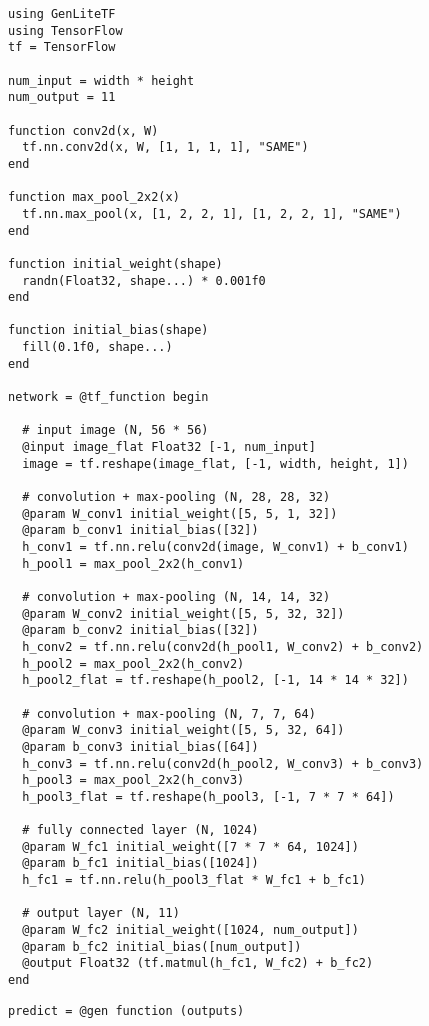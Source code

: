 \begin{figure}[t]
\begin{minipage}[t]{0.5\textwidth}
\begin{lstlisting}
using GenLiteTF
using TensorFlow
tf = TensorFlow

num_input = width * height
num_output = 11

function conv2d(x, W)
  tf.nn.conv2d(x, W, [1, 1, 1, 1], "SAME")
end

function max_pool_2x2(x)
  tf.nn.max_pool(x, [1, 2, 2, 1], [1, 2, 2, 1], "SAME")
end

function initial_weight(shape)
  randn(Float32, shape...) * 0.001f0
end

function initial_bias(shape)
  fill(0.1f0, shape...)
end

network = @tf_function begin

  # input image (N, 56 * 56)
  @input image_flat Float32 [-1, num_input]
  image = tf.reshape(image_flat, [-1, width, height, 1])

  # convolution + max-pooling (N, 28, 28, 32)
  @param W_conv1 initial_weight([5, 5, 1, 32])
  @param b_conv1 initial_bias([32])
  h_conv1 = tf.nn.relu(conv2d(image, W_conv1) + b_conv1)
  h_pool1 = max_pool_2x2(h_conv1)

  # convolution + max-pooling (N, 14, 14, 32)
  @param W_conv2 initial_weight([5, 5, 32, 32])
  @param b_conv2 initial_bias([32])
  h_conv2 = tf.nn.relu(conv2d(h_pool1, W_conv2) + b_conv2)
  h_pool2 = max_pool_2x2(h_conv2)
  h_pool2_flat = tf.reshape(h_pool2, [-1, 14 * 14 * 32])

  # convolution + max-pooling (N, 7, 7, 64)
  @param W_conv3 initial_weight([5, 5, 32, 64])
  @param b_conv3 initial_bias([64])
  h_conv3 = tf.nn.relu(conv2d(h_pool2, W_conv3) + b_conv3)
  h_pool3 = max_pool_2x2(h_conv3)
  h_pool3_flat = tf.reshape(h_pool3, [-1, 7 * 7 * 64])

  # fully connected layer (N, 1024)
  @param W_fc1 initial_weight([7 * 7 * 64, 1024])
  @param b_fc1 initial_bias([1024])
  h_fc1 = tf.nn.relu(h_pool3_flat * W_fc1 + b_fc1)

  # output layer (N, 11)
  @param W_fc2 initial_weight([1024, num_output])
  @param b_fc2 initial_bias([num_output])
  @output Float32 (tf.matmul(h_fc1, W_fc2) + b_fc2)
end

\end{lstlisting}
\end{minipage}%
\hfill
\begin{minipage}[t]{0.4\textwidth}
\begin{lstlisting}
predict = @gen function (outputs)


\end{lstlisting}
\end{minipage}
\end{figure}
